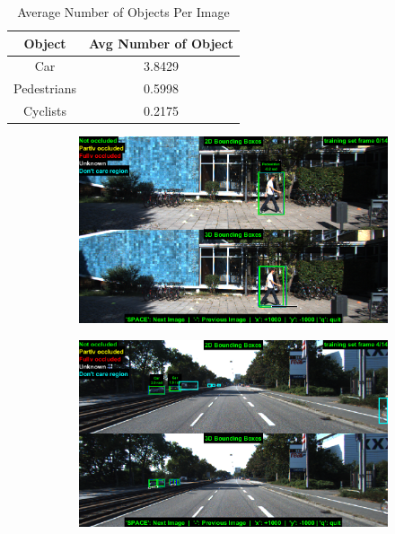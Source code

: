 \begin{table}[h!]
\centering
\begin{tabular}{ c | c }
\hline
Object & Avg Number of Object \\
\hline \hline
Car & 3.8429 \\
Pedestrians & 0.5998 \\
Cyclists & 0.2175 \\
\hline
\end{tabular}
\caption{Average Number of Objects Per Image}
\end{table}


\begin{figure}[h]
\begin{subfigure}{.5\textwidth}
    \centering
    \includegraphics[width=1.0\linewidth]{img/matlab/d1.png}
\end{subfigure}%
\begin{subfigure}{.5\textwidth}
    \centering
    \includegraphics[width=1.0\linewidth]{img/matlab/d5.png}

\end{subfigure}
\end{figure}

